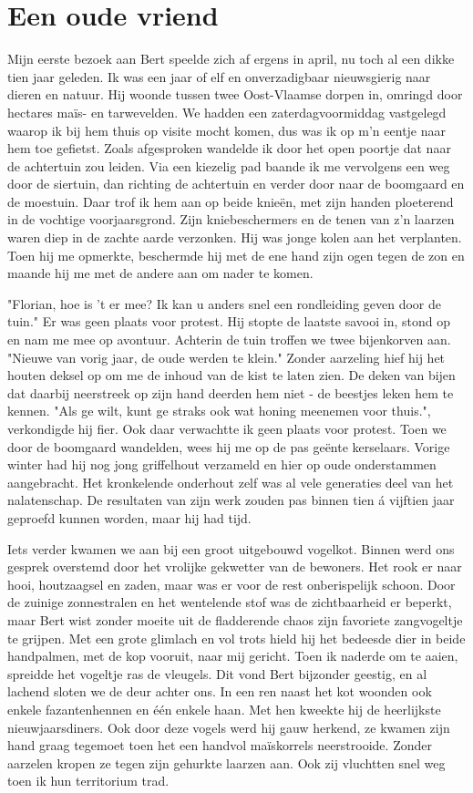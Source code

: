 \documentclass[12pt, justified, a4paper, symmetric]{tufte-book}
\begin{document}
\section{Een oude vriend}
Mijn eerste bezoek aan Bert speelde zich af ergens in april, nu toch al een dikke tien jaar geleden. Ik was een jaar of elf en onverzadigbaar nieuwsgierig naar dieren en natuur. Hij woonde tussen twee Oost-Vlaamse dorpen in, omringd door hectares ma\"is- en tarwevelden.  We hadden een zaterdagvoormiddag vastgelegd waarop ik bij hem thuis op visite mocht komen, dus was ik op m'n eentje naar hem toe gefietst. Zoals afgesproken wandelde ik door het open poortje dat naar de achtertuin zou leiden. Via een kiezelig pad baande ik me vervolgens een weg door de siertuin, dan richting de achtertuin en verder door naar de boomgaard en de moestuin. Daar trof ik hem aan op beide knie\"en, met zijn handen ploeterend in de vochtige voorjaarsgrond. Zijn kniebeschermers en de tenen van z'n laarzen waren diep in de zachte aarde verzonken. Hij was jonge kolen aan het verplanten. Toen hij me opmerkte, beschermde hij met de ene hand zijn ogen tegen de zon en maande hij me met de andere aan om nader te komen.

"Florian, hoe is 't er mee? Ik kan u anders snel een rondleiding geven door de tuin." Er was geen plaats voor protest. Hij stopte de laatste savooi in, stond op en nam me mee op avontuur. Achterin de tuin troffen we twee bijenkorven aan. "Nieuwe van vorig jaar, de oude werden te klein." Zonder aarzeling hief hij het houten deksel op om me de inhoud van de kist te laten zien. De deken van bijen dat daarbij neerstreek op zijn hand deerden hem niet - de beestjes leken hem te kennen. "Als ge wilt, kunt ge straks ook wat honing meenemen voor thuis.", verkondigde hij fier. Ook daar verwachtte ik geen plaats voor protest. Toen we door de boomgaard wandelden, wees hij me op de pas ge\"ente kerselaars. Vorige winter had hij nog jong griffelhout verzameld en hier op oude onderstammen aangebracht. Het kronkelende onderhout zelf was al vele generaties deel van het nalatenschap. De resultaten van zijn werk zouden pas binnen tien \'a vijftien jaar geproefd kunnen worden, maar hij had tijd.

Iets verder kwamen we aan bij een groot uitgebouwd vogelkot. Binnen werd ons gesprek overstemd door het vrolijke gekwetter van de bewoners. Het rook er naar hooi, houtzaagsel en zaden, maar was er voor de rest onberispelijk schoon. Door de zuinige zonnestralen en het wentelende stof was de zichtbaarheid er beperkt, maar Bert wist zonder moeite uit de fladderende chaos zijn favoriete zangvogeltje te grijpen. Met een grote glimlach en vol trots hield hij het bedeesde dier in beide handpalmen, met de kop vooruit, naar mij gericht. Toen ik naderde om te aaien, spreidde het vogeltje ras de vleugels. Dit vond Bert bijzonder geestig, en al lachend sloten we de deur achter ons. In een ren naast het kot woonden ook enkele fazantenhennen en \'e\'en enkele haan. Met hen kweekte hij de heerlijkste nieuwjaarsdiners. Ook door deze vogels werd hij gauw herkend, ze kwamen zijn hand graag tegemoet toen het een handvol ma\"iskorrels neerstrooide. Zonder aarzelen kropen ze tegen zijn gehurkte laarzen aan. Ook zij vluchtten snel weg toen ik hun territorium trad.
\end{document}
